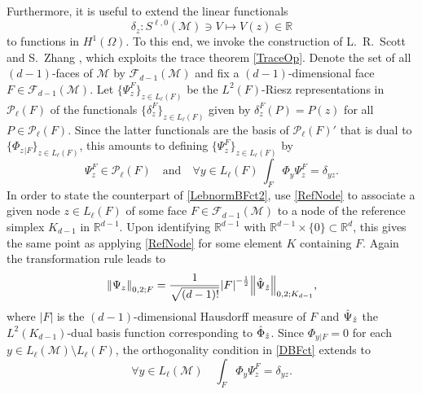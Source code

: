 \documentclass[a4paper]{amsart}
\numberwithin{equation}{section}
\theoremstyle{plain}
\theoremstyle{definition}
\begin{document}
Furthermore, it is useful to extend the linear functionals
\begin{equation}
\label{PointEVal}
 \delta_z : 
 {S}^{{\ell},0}({\mathcal{M}}) \ni V
 \mapsto
 V(z) \in {\mathbb{R}}
\end{equation}
to functions in ${H^{{1}}}(\Omega)$.  To this end, we invoke the construction of 
L.\ R.\ Scott and S.\ Zhang \cite{Scott.Zhang:90}, which exploits the trace 
theorem \eqref{TraceOp}.  Denote the set of all $(d-1)$-faces of ${\mathcal{M}}$ by 
${\mathcal{F}_{d-1}}({\mathcal{M}})$ and fix a $(d-1)$-dimensional face $F\in{\mathcal{F}_{d-1}}({\mathcal{M}})$.  Let 
$\{{\Psi}^F_z\}_{z\in{L_{{\ell}}}({F})}$ be the ${L^{{2}}}({F})$-Riesz 
representations in ${\mathcal{P}_{{\ell}}({{F}})}$ of the functionals 
$\{\delta_z^{F}\}_{z\in{L_{{\ell}}}({F})}$ given by 
$\delta_z^{F}(P)=P(z)$ for all $P\in{\mathcal{P}_{{\ell}}({{F}})}$.  Since the latter 
functionals are the basis of ${\mathcal{P}_{{\ell}}({{F}})}'$ that is dual to 
$\{{\Phi}_z{}_{|{F}}\}_{z\in{L_{{\ell}}}({F})}$, this amounts to 
defining $\{{\Psi}_z^{F}\}_{z\in{L_{{\ell}}}({F})}$ by
\begin{equation}
\label{DBFct}
 {\Psi}_z^{F}\in{\mathcal{P}_{{\ell}}({{F}})}
\quad\text{and}\quad
 \forall y\in{L_{{\ell}}}({F}) \ 
  \int_F {\Phi}_y {\Psi}_z^{F} = \delta_{yz}.
\end{equation}
In order to state the counterpart of \eqref{LebnormBFct2}, use
\eqref{RefNode} to associate a given node
$z\in{L_{{\ell}}}({F})$ of some face ${F}\in{\mathcal{F}_{d-1}}({\mathcal{M}})$ to
a node of the reference simplex ${K}_{d-1}$ in ${\mathbb{R}}^{d-1}$.  Upon
identifying ${\mathbb{R}}^{d-1}$ with ${\mathbb{R}}^{d-1}\times\{0\}\subset{{\mathbb{R}}^d}$, this
gives the same point as applying \eqref{RefNode} for some element
${K}$ containing ${F}$.  Again the transformation rule leads to
\begin{equation}
\label{LebnormDBFct2} 
 {{\left\|{{{\Psi}_z}}\right\|_{{0,2;{F}}}}}
 =
 \frac{1}{\sqrt{(d-1)!}}{\left|{F}\right|}^{-\frac12}
 {{\left\|{{\Hat{\Psi}_{\Hat z}}}\right\|_{{0,2;{{K}_{d-1}}}}}},
\end{equation}
where ${\left|{F}\right|}$ is the $(d-1)$-dimensional Hausdorff measure of
${F}$ and $\Hat{\Psi}_{\Hat z}$ the $L^2({K}_{d-1})$-dual basis
function corresponding to $\Hat{\Phi}_{\Hat z}$.  Since
${\Phi}_y{}_{|{F}}=0$ for each
$y\in{L_{{\ell}}}({\mathcal{M}})\setminus{L_{{\ell}}}({F})$, the
orthogonality condition in \eqref{DBFct} extends to
\[
 \forall y\in{L_{{\ell}}}({\mathcal{M}})
\quad 
 \int_F {\Phi}_y {\Psi}_z^{F} = \delta_{yz}.
\]
\end{document}
